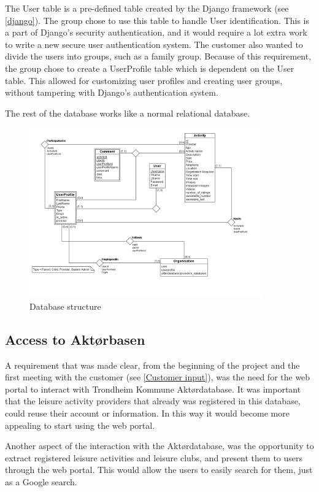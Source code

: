 The User table is a pre-defined table created by the Django framework (see \ref{django}). The group chose to use this table to handle User identification. This is a part of Django's security authentication, and it would require a lot extra work to write a new secure user authentication system. The customer also wanted to divide the users into groups, such as a family group. Because of this requirement, the group chose to create a UserProfile table which is dependent on the User table. This allowed for customizing user profiles and creating user groups, without tampering with Django's authentication system. 

The rest of the database works like a normal relational database.

\begin{figure}[ht]
\centering
    \includegraphics[width=0.90\textwidth]{fig/erDatabase}
\caption{Database structure}
\label{Database_Figure}
\end{figure}


\subsection{Access to Aktørbasen}
\label{Aktordatabasen}
A requirement that was made clear, from the beginning of the project and the first meeting with the customer (see \ref{Customer input}), was the need for the web portal to interact with Trondheim Kommune Aktørdatabase. It was important that the leisure activity providers that already was registered in this database, could reuse their account or information. In this way it would become more appealing to start using the web portal.

Another aspect of the interaction with the Aktørdatabase, was the opportunity to extract registered leisure activities and leisure clubs, and present them to users through the  web portal. This would allow the users to easily search for them, just as a Google search. 

